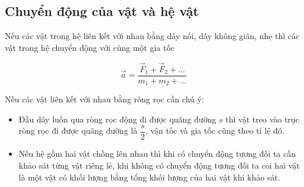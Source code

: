 \subsection{Chuyển động của vật và hệ vật}
Nếu các vật trong hệ liên kết với nhau bằng dây nối, dây không giãn, nhẹ thì các vật trong hệ chuyển động với cùng một gia tốc

\begin{equation*}
	\vec a = \dfrac{\vec F_1 + \vec F_2 + ...}{m_1 + m_2+...}
\end{equation*}

Nếu các vật liên kết với nhau bằng ròng rọc cần chú ý:
\begin{itemize}
\item Đầu dây luồn qua ròng rọc động đi được quãng đường $s$ thì vật treo vào trục ròng rọc đi được quãng đường là $\dfrac{s}{2}$, vận tốc và gia tốc cũng theo tỉ lệ đó.

\item Nếu hệ gồm hai vật chồng lên nhau thì khi có chuyển động tương đối ta cần khảo sát từng vật riêng lẻ, khi không có chuyển động tương đối ta coi hai vật là một vật có khối lượng bằng tổng khối lượng của hai vật khi khảo sát.
\end{itemize}
